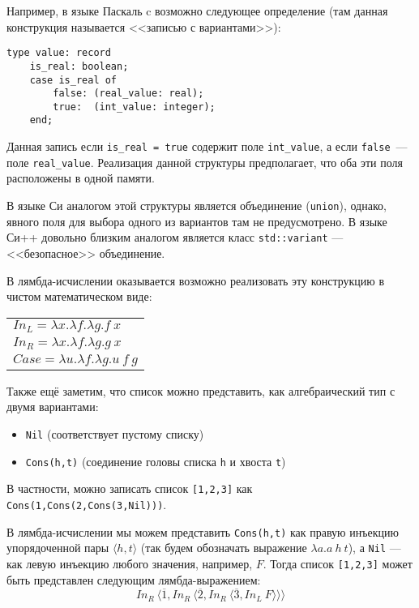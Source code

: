 \documentclass[10pt,a4paper,oneside]{article}
\begin{document}
\begin{enumerate}
Например, в языке Паскаль c возможно следующее определение (там данная конструкция называется
<<записью с вариантами>>):

\begin{verbatim}
type value: record 
    is_real: boolean;
    case is_real of
        false: (real_value: real);
        true:  (int_value: integer);
    end;
\end{verbatim}

Данная запись если \verb!is_real = true! содержит поле 
\verb!int_value!, а если \verb!false!~--- поле \verb!real_value!. Реализация данной структуры
предполагает, что оба эти поля расположены в одной памяти.

В языке Си аналогом этой структуры является объединение (\verb!union!), однако, явного поля для выбора
одного из вариантов там не предусмотрено. В языке Си++ довольно близким аналогом является
класс \verb!std::variant! --- <<безопасное>> объединение.

В лямбда-исчислении оказывается возможно реализовать эту конструкцию в чистом математическом
виде:

\begin{center}\begin{tabular}{l}
$In_L = \lambda x.\lambda f.\lambda g.f\ x$\\
$In_R = \lambda x.\lambda f.\lambda g.g\ x$\\
$Case = \lambda u.\lambda f.\lambda g.u\ f\ g$
\end{tabular}\end{center}

Также ещё заметим, что список можно представить, как алгебраический тип с двумя вариантами:
\begin{itemize}
\item \verb!Nil! (соответствует пустому списку)
\item \verb!Cons(h,t)! (соединение головы списка \verb!h! и хвоста \verb!t!)
\end{itemize}
В частности, можно записать список \verb![1,2,3]! как \verb!Cons(1,Cons(2,Cons(3,Nil)))!.

В лямбда-исчислении мы можем представить \verb!Cons(h,t)! как правую инъекцию упорядоченной
пары $\langle h,t\rangle$ (так
будем обозначать выражение $\lambda a.a\ h\ t$),
а \verb!Nil! --- как левую инъекцию любого значения, например, $F$. Тогда список \verb![1,2,3]! может быть представлен
следующим лямбда-выражением:
$$In_R\ \langle\overline{1}, In_R\ \langle\overline{2}, In_R\ \langle\overline{3},In_L\ F\rangle\rangle\rangle$$


\end{enumerate}
\end{document}
